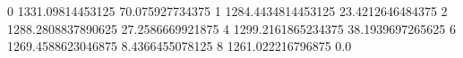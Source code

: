 0 1331.09814453125 70.075927734375
1 1284.4434814453125 23.4212646484375
2 1288.2808837890625 27.2586669921875
4 1299.2161865234375 38.1939697265625
6 1269.4588623046875 8.4366455078125
8 1261.022216796875 0.0
